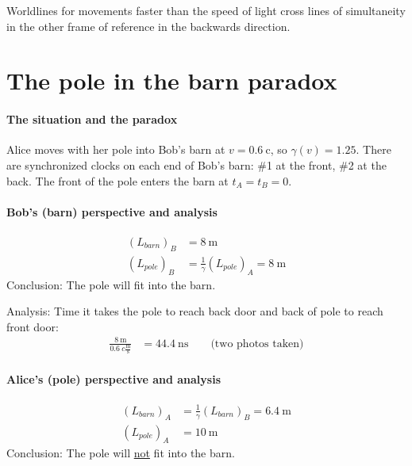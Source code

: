 \documentclass[pagesize,headsepline,10pt,parskip=half]{scrreprt}
\newcommand{\const}[1]{\ensuremath{\mathrm{#1}}}
\renewcommand{\c}{\const{c}}
\begin{document}
      Worldlines for movements faster than the speed of light cross lines
      of simultaneity in the other frame of reference in the backwards
      direction.
    \section{The pole in the barn paradox}
      \paragraph{The situation and the paradox}
        Alice moves with her pole into Bob's barn at $v = \SI{0.6}{\c}$, so
        $\gamma(v) = 1.25$.  There are synchronized clocks on each end of
        Bob's barn: \#1 at the front, \#2 at the back.  The front of the pole
        enters the barn at $t_A = t_B = 0$.

      \paragraph{Bob’s (barn) perspective and analysis}
        \begin{align*}
          {(L_{barn})}_B &= \SI{8}{\meter}\\
          {(L_{pole})}_B &= \frac{1}{\gamma} {(L_{pole})}_A = \SI{8}{\meter}
        \end{align*}
        Conclusion: The pole will fit into the barn.

        Analysis:
        Time it takes the pole to reach back door and back of pole to reach front door:
        \begin{align*}
          \frac{\SI{8}{\meter}}{\SI{0.6}{c} \frac{\text{m}}{\text{s}}}
          &= \SI{44.4}{\nano\second} \qquad \text{(two photos taken)}
        \end{align*}

      \paragraph{Alice’s (pole) perspective and analysis}
        \begin{align*}
          {(L_{barn})}_A &= \frac{1}{\gamma} {(L_{barn})}_B = \SI{6.4}{\meter}\\
          {(L_{pole})}_A &= \SI{10}{\meter}
        \end{align*}
        Conclusion: The pole will \underline{not} fit into the barn.
\end{document}
